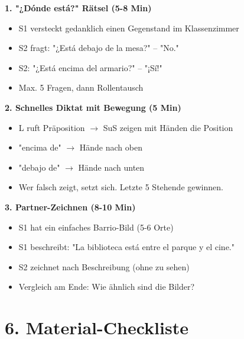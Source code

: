 \documentclass[11pt, a4paper]{article}
\begin{document}
\begin{spielebox}
\textbf{1. "¿Dónde está?" Rätsel (5-8 Min)}
\begin{itemize}
    \item S1 versteckt gedanklich einen Gegenstand im Klassenzimmer
    \item S2 fragt: "¿Está debajo de la mesa?" -- "No."
    \item S2: "¿Está encima del armario?" -- "¡Sí!"
    \item Max. 5 Fragen, dann Rollentausch
\end{itemize}

\vspace{0.5em}

\textbf{2. Schnelles Diktat mit Bewegung (5 Min)}
\begin{itemize}
    \item L ruft Präposition $\rightarrow$ SuS zeigen mit Händen die Position
    \item "encima de" $\rightarrow$ Hände nach oben
    \item "debajo de" $\rightarrow$ Hände nach unten
    \item Wer falsch zeigt, setzt sich. Letzte 5 Stehende gewinnen.
\end{itemize}

\vspace{0.5em}

\textbf{3. Partner-Zeichnen (8-10 Min)}
\begin{itemize}
    \item S1 hat ein einfaches Barrio-Bild (5-6 Orte)
    \item S1 beschreibt: "La biblioteca está entre el parque y el cine."
    \item S2 zeichnet nach Beschreibung (ohne zu sehen)
    \item Vergleich am Ende: Wie ähnlich sind die Bilder?
\end{itemize}
\end{spielebox}


\section*{6. Material-Checkliste}
\end{document}
